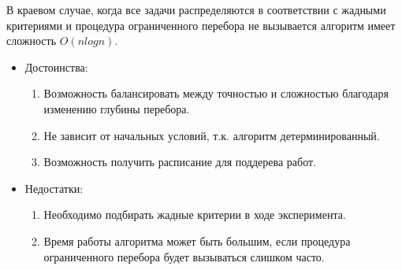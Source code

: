 В краевом случае, когда все задачи распределяются в соответствии с жадными критериями и процедура ограниченного перебора не вызывается алгоритм имеет сложность $O(nlogn)$.

\begin{itemize}
    \item Достоинства:
    \begin{enumerate}
        \item Возможность балансировать между точностью и сложностью благодаря изменению глубины перебора.
        \item Не зависит от начальных условий, т.к. алгоритм детерминированный.
        \item Возможность получить расписание для поддерева работ.
    \end{enumerate}


    \item Недостатки:
    \begin{enumerate}
        \item Необходимо подбирать жадные критерии в ходе эксперимента.
        \item Время работы алгоритма может быть большим, если процедура ограниченного перебора будет вызываться слишком часто.
    \end{enumerate}
\end{itemize}

